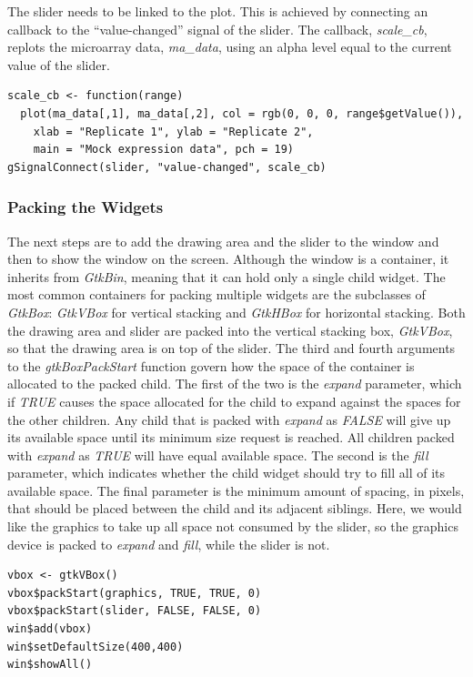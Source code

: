 \documentclass[article]{jss}
\begin{document}
The slider needs to be linked to the plot. This is achieved by connecting
an  callback to the ``value-changed'' signal of the slider. The callback,
\emph{scale\_cb}, replots the microarray data, \emph{ma\_data}, using
an alpha level equal to the current value of the slider. 
\begin{verbatim}
scale_cb <- function(range) 
  plot(ma_data[,1], ma_data[,2], col = rgb(0, 0, 0, range$getValue()),
    xlab = "Replicate 1", ylab = "Replicate 2", 
    main = "Mock expression data", pch = 19)
gSignalConnect(slider, "value-changed", scale_cb)
\end{verbatim}

\subsubsection{Packing the Widgets}

The next steps are to add the drawing area and the slider to the
window and then to show the window on the screen. Although the window is a
container, it inherits from \emph{GtkBin}, meaning that it can hold only
a single child widget. The most common containers for packing multiple widgets
are the subclasses of \emph{GtkBox}: \emph{GtkVBox} for vertical stacking and
\emph{GtkHBox} for horizontal stacking. Both the drawing
area and slider are packed into the vertical stacking box,
\emph{GtkVBox}, so that the drawing area is on top of the slider. The third and 
fourth arguments to the \emph{gtkBoxPackStart} function govern how the
space of the container is allocated to the packed child. The first of the two
is the \emph{expand} parameter, which if \emph{TRUE} causes the space allocated
for the child to expand against the spaces for the other children. Any child
that is packed with \emph{expand} as \emph{FALSE} will give up its available
space until its minimum size request is reached. All children packed with
\emph{expand} as \emph{TRUE} will have equal available space. The second is
the \emph{fill} parameter, which indicates whether the child widget should try to
fill all of its available space. The final parameter is the minimum amount of 
spacing, in pixels, that should be placed between the child and its adjacent siblings.
Here, we would like the graphics to take up all space not consumed by the slider,
so the graphics device is packed to \emph{expand} and \emph{fill}, while the
slider is not.
\begin{verbatim}
vbox <- gtkVBox()
vbox$packStart(graphics, TRUE, TRUE, 0)
vbox$packStart(slider, FALSE, FALSE, 0)
win$add(vbox)
win$setDefaultSize(400,400)
win$showAll() 
\end{verbatim}
\end{document}
